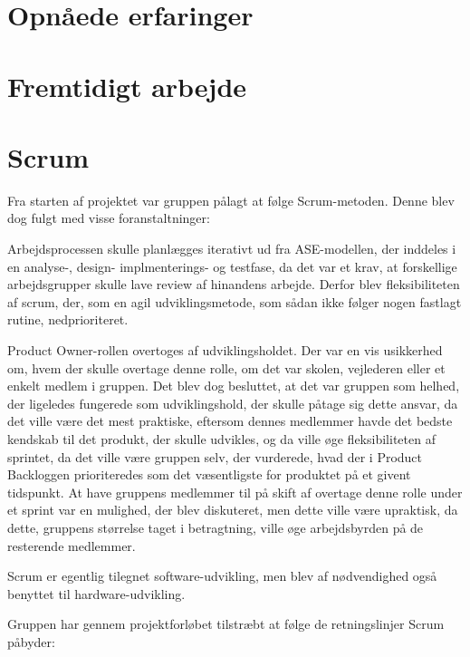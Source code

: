 \section{Opnåede erfaringer}

\section{Fremtidigt arbejde}

\section{Scrum}
Fra starten af projektet var gruppen pålagt at følge Scrum-metoden. Denne blev dog fulgt med visse foranstaltninger:

Arbejdsprocessen skulle planlægges iterativt ud fra ASE-modellen, der inddeles i en analyse-, design- implmenterings- og testfase, da det var et krav, at forskellige
arbejdsgrupper skulle lave review af hinandens arbejde. Derfor blev fleksibiliteten af scrum, der, som en agil udviklingsmetode, som sådan ikke følger nogen
fastlagt rutine, nedprioriteret.

Product Owner-rollen overtoges af udviklingsholdet. Der var en vis usikkerhed om, hvem der skulle overtage denne rolle, om det var skolen, vejlederen eller et
enkelt medlem i gruppen. Det blev dog besluttet, at det var gruppen som helhed, der ligeledes fungerede som udviklingshold, der skulle påtage sig dette ansvar, da
det ville være det mest praktiske, eftersom dennes medlemmer havde det bedste kendskab til det produkt, der skulle udvikles, og da ville øge fleksibiliteten af
sprintet, da det ville være gruppen selv, der vurderede, hvad der i Product Backloggen prioriteredes som det væsentligste for produktet på et givent tidspunkt.
At have gruppens medlemmer til på skift af overtage denne rolle under et sprint var en mulighed, der blev diskuteret, men dette ville være upraktisk, da dette,
gruppens størrelse taget i betragtning, ville øge arbejdsbyrden på de resterende medlemmer.

Scrum er egentlig tilegnet software-udvikling, men blev af nødvendighed også benyttet til hardware-udvikling.

Gruppen har gennem projektforløbet tilstræbt at følge de retningslinjer Scrum påbyder:

